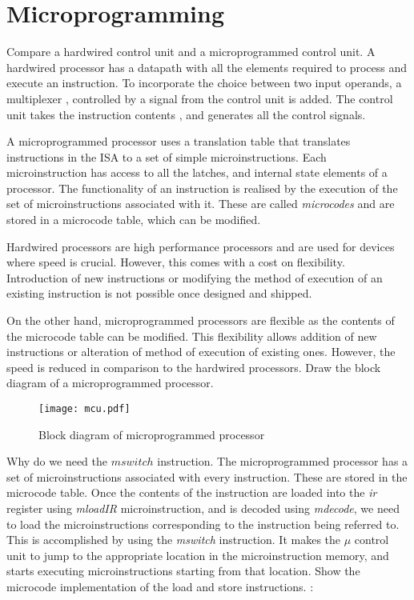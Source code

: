 \section*{Microprogramming}

\begin{ExerciseList}

\Exercise Compare a hardwired control unit and a microprogrammed control unit.
\Answer
A hardwired processor has a datapath with all the elements required to process and execute an instruction. To incorporate the choice between two input operands, a multiplexer , controlled by a signal from the control unit is added. The control unit takes the instruction contents , and generates all the control signals. 

A microprogrammed processor uses a translation table that translates instructions in the ISA to a set of simple microinstructions. Each microinstruction has access to all the latches, and internal state elements of a processor. The functionality of an instruction is realised by the execution of the set of microinstructions associated with it. These are called \textit{microcodes} and are stored in a microcode table, which can be modified.

Hardwired processors are high performance processors and are used for devices where speed is crucial. However, this comes with a cost on flexibility. Introduction of new instructions or modifying the method of execution of an existing instruction is not possible once designed and shipped.

On the other hand, microprogrammed processors are flexible as the contents of the microcode table can be modified. This flexibility allows addition of new instructions or alteration of method of execution of existing ones. However, the speed is reduced in comparison to the hardwired processors. 
\Exercise Draw the block diagram of a microprogrammed processor.

\begin{figure}[H]
  \centering
  \texttt{[image: mcu.pdf]}
  \caption{Block diagram of microprogrammed processor}
\end{figure}

\Exercise Why do we need the $mswitch$ instruction.
\Answer
The microprogrammed processor has a set of microinstructions associated with every instruction. These are stored in the microcode table. Once the contents of the instruction are loaded into the \textit{ir} register using \textit{mloadIR} microinstruction, and is decoded using \textit{mdecode}, we need to load the microinstructions corresponding to the instruction being referred to. This is accomplished by using the \textit{mswitch} instruction.
It makes the $\mu$ control unit to jump to the appropriate location in the microinstruction memory, and starts executing microinstructions starting from that location. 
\Exercise
Show the microcode implementation of the load and store instructions.
\Answer :


\end{ExerciseList}
